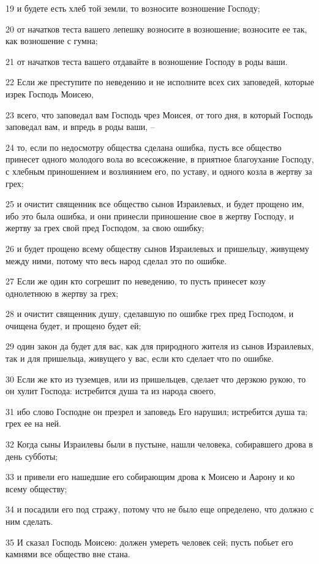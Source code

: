 \par 19 и будете есть хлеб той земли, то возносите возношение Господу;
\par 20 от начатков теста вашего лепешку возносите в возношение; возносите ее так, как возношение с гумна;
\par 21 от начатков теста вашего отдавайте в возношение Господу в роды ваши.
\par 22 Если же преступите по неведению и не исполните всех сих заповедей, которые изрек Господь Моисею,
\par 23 всего, что заповедал вам Господь чрез Моисея, от того дня, в который Господь заповедал вам, и впредь в роды ваши, --
\par 24 то, если по недосмотру общества сделана ошибка, пусть все общество принесет одного молодого вола во всесожжение, в приятное благоухание Господу, с хлебным приношением и возлиянием его, по уставу, и одного козла в жертву за грех;
\par 25 и очистит священник все общество сынов Израилевых, и будет прощено им, ибо это была ошибка, и они принесли приношение свое в жертву Господу, и жертву за грех свой пред Господом, за свою ошибку;
\par 26 и будет прощено всему обществу сынов Израилевых и пришельцу, живущему между ними, потому что весь народ сделал это по ошибке.
\par 27 Если же один кто согрешит по неведению, то пусть принесет козу однолетнюю в жертву за грех;
\par 28 и очистит священник душу, сделавшую по ошибке грех пред Господом, и очищена будет, и прощено будет ей;
\par 29 один закон да будет для вас, как для природного жителя из сынов Израилевых, так и для пришельца, живущего у вас, если кто сделает что по ошибке.
\par 30 Если же кто из туземцев, или из пришельцев, сделает что дерзкою рукою, то он хулит Господа: истребится душа та из народа своего,
\par 31 ибо слово Господне он презрел и заповедь Его нарушил; истребится душа та; грех ее на ней.
\par 32 Когда сыны Израилевы были в пустыне, нашли человека, собиравшего дрова в день субботы;
\par 33 и привели его нашедшие его собирающим дрова к Моисею и Аарону и ко всему обществу;
\par 34 и посадили его под стражу, потому что не было еще определено, что должно с ним сделать.
\par 35 И сказал Господь Моисею: должен умереть человек сей; пусть побьет его камнями все общество вне стана.
